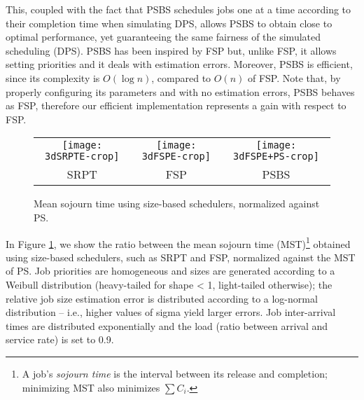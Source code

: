 \documentclass[11pt,oneside,english]{amsart}
\providecommand{\tabularnewline}{\\}
\numberwithin{equation}{section}
\numberwithin{figure}{section}
\theoremstyle{definition}
\theoremstyle{plain}
\begin{document}
This, coupled with the fact that PSBS schedules jobs one at a time 
according to their completion time when simulating DPS, 
allows PSBS to obtain close to optimal performance, yet guaranteeing 
the same fairness of the simulated scheduling (DPS). 
PSBS has been inspired by FSP but, unlike FSP, it allows setting priorities
and it deals with estimation errors. Moreover, PSBS
is efficient, since its complexity is $O\left(\log n\right)$, compared to
$O\left(n\right)$ of FSP. Note that, by properly configuring its parameters and 
with no estimation errors, PSBS behaves as FSP, therefore our efficient 
implementation represents a gain with respect to FSP.

\begin{comment}
executes jobs serially according to their completion
order in DPS; the abovementioned problem is solved by changing the
scheduling policy as soon as one or more jobs become ``late'', i.e.,
pending in the real system even if they are already completed in the
simlated case. Due to the dominance result shown in Section \ref{sec:Analytical-Results},
this can only be caused by job size estimation errors; in this case,
resources are shared between late jobs according to the DPS policy.
PSBS allows defining job priorities, and it has an efficient $O\left(\log n\right)$
implementation.
\end{comment}

\begin{figure}
\begin{centering}
\begin{tabular}{ccc}
\texttt{[image: 3dSRPTE-crop]} & \texttt{[image: 3dFSPE-crop]} & \texttt{[image: 3dFSPE+PS-crop]}\tabularnewline
SRPT & FSP & PSBS\tabularnewline
\end{tabular}
\par\end{centering}

\caption{\label{fig:Mean-sojourn-time}Mean sojourn time using size-based schedulers,
normalized against PS.}
\end{figure}


In Figure \ref{fig:Mean-sojourn-time}, we show the ratio between
the mean sojourn time (MST)\footnote{A job's \emph{sojourn time} is the interval between its release
and completion; minimizing MST also minimizes $\sum C_{i}$.} obtained using size-based schedulers, such as SRPT and FSP, 
normalized against the MST
of PS. Job priorities are homogeneous and sizes are generated according
to a Weibull distribution (heavy-tailed for shape < 1, light-tailed
otherwise); the relative job size estimation error is distributed
according to a log-normal distribution -- i.e., higher values of sigma
yield larger errors. Job inter-arrival times are distributed exponentially
and the load (ratio between arrival and service rate) is set
to 0.9.
\end{document}
